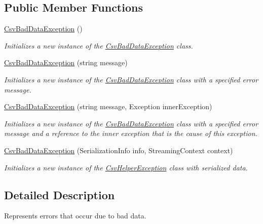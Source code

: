 \subsection*{Public Member Functions}
\begin{DoxyCompactItemize}
\item 
\hyperlink{a00037_a337ebca212c62127ba837ae726a0cc3a}{Csv\-Bad\-Data\-Exception} ()
\begin{DoxyCompactList}\small\item\em Initializes a new instance of the \hyperlink{a00037}{Csv\-Bad\-Data\-Exception} class. \end{DoxyCompactList}\item 
\hyperlink{a00037_a31da9e807053a75e8bd252aa792269eb}{Csv\-Bad\-Data\-Exception} (string message)
\begin{DoxyCompactList}\small\item\em Initializes a new instance of the \hyperlink{a00037}{Csv\-Bad\-Data\-Exception} class with a specified error message. \end{DoxyCompactList}\item 
\hyperlink{a00037_a2c210cf80604e58ffecc177f6f7c2547}{Csv\-Bad\-Data\-Exception} (string message, Exception inner\-Exception)
\begin{DoxyCompactList}\small\item\em Initializes a new instance of the \hyperlink{a00037}{Csv\-Bad\-Data\-Exception} class with a specified error message and a reference to the inner exception that is the cause of this exception. \end{DoxyCompactList}\item 
\hyperlink{a00037_abe956c9c100374953fd899bef2f2489f}{Csv\-Bad\-Data\-Exception} (Serialization\-Info info, Streaming\-Context context)
\begin{DoxyCompactList}\small\item\em Initializes a new instance of the \hyperlink{a00044}{Csv\-Helper\-Exception} class with serialized data. \end{DoxyCompactList}\end{DoxyCompactItemize}


\subsection{Detailed Description}
Represents errors that occur due to bad data. 



